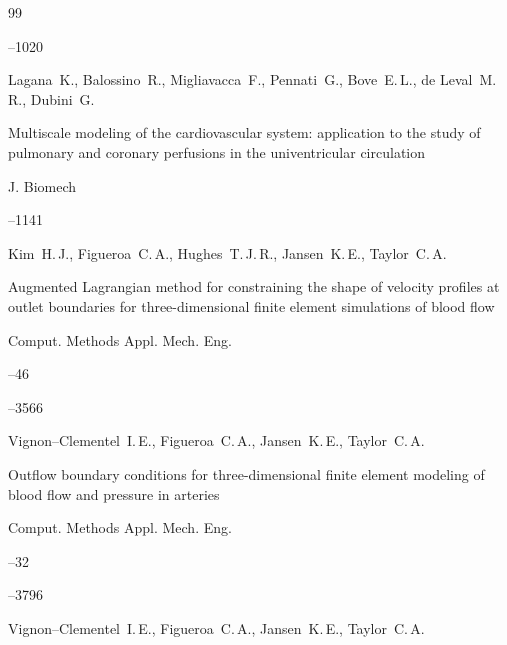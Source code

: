 \begin{thebibliography}{99}


--1020





\by Lagana~K., Balossino~R., Migliavacca~F., Pennati~G., Bove~E.\,L., de Leval~M.\,R., Dubini~G.

\paper Multiscale modeling of the cardiovascular system: application to the study of pulmonary and coronary perfusions in the univentricular circulation

\jour J. Biomech



--1141





\by Kim~H.\,J., Figueroa~C.\,A., Hughes~T.\,J.\,R., Jansen~K.\,E., Taylor~C.\,A.

\paper Augmented Lagrangian method for constraining the shape of velocity profiles at outlet boundaries for three-dimensional finite element simulations of blood flow

\jour Comput. Methods Appl. Mech. Eng. 


--46

--3566







\by Vignon--Clementel~I.\,E., Figueroa~C.\,A., Jansen~K.\,E., Taylor~C.\,A. 

\paper Outflow boundary conditions for three-dimensional finite element modeling of blood flow and pressure in arteries

\jour Comput. Methods Appl. Mech. Eng. 


--32

--3796







\by Vignon--Clementel~I.\,E., Figueroa~C.\,A., Jansen~K.\,E., Taylor~C.\,A.


\end{thebibliography}

